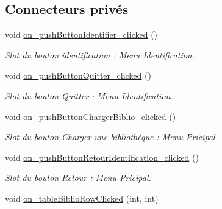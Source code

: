 \subsection*{Connecteurs privés}
\begin{DoxyCompactItemize}
\item 
\mbox{\label{classMainWindow_a288eee5287611da2b2e5844478e7c928}} 
void \hyperlink{classMainWindow_a288eee5287611da2b2e5844478e7c928}{on\+\_\+push\+Button\+Identifier\+\_\+clicked} ()
\begin{DoxyCompactList}\small\item\em Slot du bouton identification \+: Menu Identification. \end{DoxyCompactList}\item 
\mbox{\label{classMainWindow_a94045fe84db5691c70d2bb3e806f0812}} 
void \hyperlink{classMainWindow_a94045fe84db5691c70d2bb3e806f0812}{on\+\_\+push\+Button\+Quitter\+\_\+clicked} ()
\begin{DoxyCompactList}\small\item\em Slot du bouton Quitter \+: Menu Identification. \end{DoxyCompactList}\item 
\mbox{\label{classMainWindow_a46c11c6c090ccb3cd8f9584c2b9dbf48}} 
void \hyperlink{classMainWindow_a46c11c6c090ccb3cd8f9584c2b9dbf48}{on\+\_\+push\+Button\+Charger\+Biblio\+\_\+clicked} ()
\begin{DoxyCompactList}\small\item\em Slot du bouton Charger une bibliothèque \+: Menu Pricipal. \end{DoxyCompactList}\item 
\mbox{\label{classMainWindow_a141877383fb575d9e847e22ac7d274c7}} 
void \hyperlink{classMainWindow_a141877383fb575d9e847e22ac7d274c7}{on\+\_\+push\+Button\+Retour\+Identification\+\_\+clicked} ()
\begin{DoxyCompactList}\small\item\em Slot du bouton Retour \+: Menu Pricipal. \end{DoxyCompactList}\item 
\mbox{\label{classMainWindow_a97069de59e1201e639a2dc064e6d2427}} 
void \hyperlink{classMainWindow_a97069de59e1201e639a2dc064e6d2427}{on\+\_\+table\+Biblio\+Row\+Clicked} (int, int)

\end{DoxyCompactItemize}
